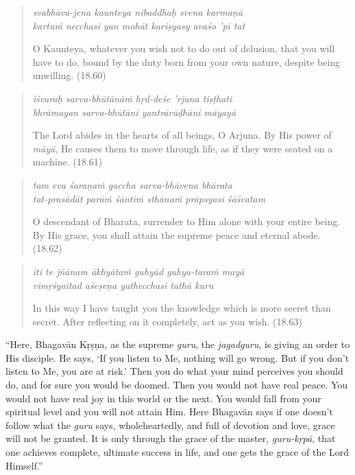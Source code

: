 \documentclass[12pt, twoside, openright]{memoir}
\begin{document}
\par
\begin{verse}
\textit{svabhāva-jena kaunteya nibaddhaḥ svena karmaṇā} \\
\textit{kartuṁ necchasi yan mohāt kariṣyasy avaśo ’pi tat}

\noindent O Kaunteya, whatever you wish not to do out of delusion, that you will have to do, bound by the duty born from your own nature, despite being unwilling. (18.60)
\end{verse}
\par



\par
\begin{verse}
\textit{īśvaraḥ sarva-bhūtānāṁ hṛd-deśe ’rjuna tiṣṭhati} \\
\textit{bhrāmayan sarva-bhūtāni yantrārūḍhāni māyayā}

\noindent The Lord abides in the hearts of all beings, O Arjuna. By His power of \textit{māyā}, He causes them to move through life, as if they were seated on a machine. (18.61)
\end{verse}
\par



\par
\begin{verse}
\textit{tam eva śaraṇaṁ gaccha sarva-bhāvena bhārata} \\
\textit{tat-prasādāt parāṁ śāntiṁ sthānaṁ prāpsyasi śāśvatam}

\noindent O descendant of Bharata, surrender to Him alone with your entire being. By His grace, you shall attain the supreme peace and eternal abode. (18.62)
\end{verse}
\par



\par
\begin{verse}
\textit{iti te jñānam ākhyātaṁ guhyād guhya-taraṁ mayā} \\
\textit{vimṛśyaitad aśeṣeṇa yathecchasi tathā kuru}

\noindent In this way I have taught you the knowledge which is more secret than secret. After reflecting on it completely, act as you wish. (18.63)
\end{verse}
\par


\enquote{Here, Bhagavān Kṛṣṇa, as the supreme \textit{guru}, the \textit{jagadguru}, is giving an order to His disciple. He says, \enquote{If you listen to Me, nothing will go wrong. But if you don’t listen to Me, you are at risk.} Then you do what your mind perceives you should do, and for sure you would be doomed. Then you would not have real peace. You would not have real joy in this world or the next. You would fall from your spiritual level and you will not attain Him. Here Bhagavān says if one doesn’t follow what the \textit{guru} says, wholeheartedly, and full of devotion and love, grace will not be granted. It is only through the grace of the master, \textit{guru-kṛpā}, that one achieves complete, ultimate success in life, and one gets the grace of the Lord Himself.}
\end{document}
